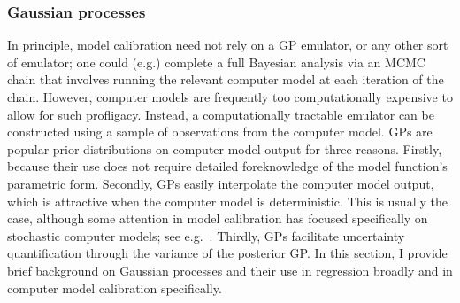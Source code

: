 \documentclass{article}
\begin{document}
%

\subsubsection{Gaussian processes} \label{gaussian_processes}

In principle, model calibration
need not rely on a GP emulator, or any other sort of emulator; one could (e.g.) complete a full Bayesian analysis via an MCMC chain that involves running the relevant computer model at each iteration of the chain. However, computer models are frequently too computationally expensive to allow for such profligacy. Instead, a computationally tractable emulator can be constructed using a sample of observations from the computer model. GPs are popular prior distributions on computer model output for three reasons. Firstly, because their use does not require detailed foreknowledge of the model function's parametric form. Secondly, GPs easily interpolate the computer model output, which is attractive when the computer model is deterministic. This is usually the case, although some attention in model calibration has focused specifically on stochastic computer models; see e.g.\ \cite{Pratola2018}. Thirdly, GPs facilitate uncertainty quantification through the variance of the posterior GP. In this section, I provide brief background on Gaussian processes and their use in regression broadly and in computer model calibration specifically.
\end{document}
